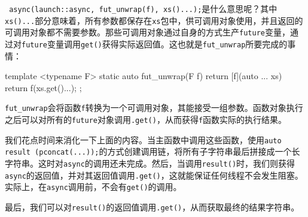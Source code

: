\texttt{ async(launch::async, fut\_unwrap(f), xs()...);}是什么意思呢？其中\texttt{xs()...}部分意味着，所有参数都保存在\texttt{xs}包中，供可调用对象使用，并且返回的可调用对象都不需要参数。那些可调用对象通过自身的方式生产\texttt{future}变量，通过对\texttt{future}变量调用\texttt{get()}获得实际返回值。这也就是\texttt{fut\_unwrap}所要完成的事情：

\begin{codebox}[cpp]
template <typename F>
static auto fut_unwrap(F f)
{
    return [f](auto ... xs) {
        return f(xs.get()...);
    };
}
\end{codebox}

\texttt{fut\_unwrap}会将函数\texttt{f}转换为一个可调用对象，其能接受一组参数。函数对象执行之后可以对所有的\texttt{future}对象调用\texttt{.get()}，从而获得\texttt{f}函数实际的执行结果。

我们花点时间来消化一下上面的内容。当主函数中调用这些函数，使用\texttt{auto result (pconcat(...));}的方式创建调用链，将所有子字符串最后拼接成一个长字符串。这时对\texttt{async}的调用还未完成。然后，当调用\texttt{result()}时，我们则获得\texttt{async}的返回值，并对其返回值调用\texttt{.get()}，这就能保证任何线程不会发生阻塞。实际上，在\texttt{async}调用前，不会有\texttt{get()}的调用。

最后，我们可以对\texttt{result()}的返回值调用\texttt{.get()}，从而获取最终的结果字符串。


